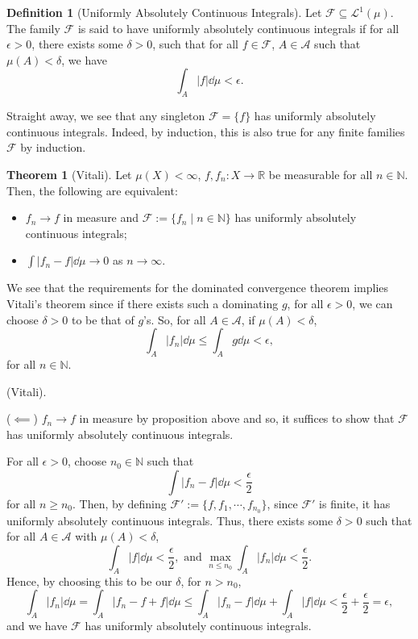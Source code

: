 \documentclass[
]{article}
\theoremstyle{definition}
\newtheorem{theorem}{Theorem}
\theoremstyle{definition}
\newtheorem{definition}{Definition}[section]
\begin{document}
\begin{definition}[Uniformly Absolutely Continuous Integrals]
  Let \(\mathcal{F} \subseteq \mathcal{L}^1(\mu)\). The family \(\mathcal{F}\) is 
  said to have uniformly absolutely continuous integrals if for all \(\epsilon > 0\), 
  there exists some \(\delta > 0\), such that for all \(f \in \mathcal{F}\), 
  \(A \in \mathcal{A}\) such that \(\mu(A) < \delta\), we have 
  \[\int_A |f| \dd \mu < \epsilon.\]
\end{definition}

Straight away, we see that any singleton \(\mathcal{F} = \{f\}\) has
uniformly absolutely continuous integrals. Indeed, by induction, this is
also true for any finite families \(\mathcal{F}\) by induction.

\begin{theorem}[Vitali]
  Let \(\mu(X) < \infty\), \(f, f_n : X \to \mathbb{R}\) be measurable for all 
  \(n \in \mathbb{N}\). Then, the following are equivalent:
  \begin{itemize}
    \item \(f_n \to f\) in measure and \(\mathcal{F} := \{f_n \mid n \in \mathbb{N}\}\) 
      has uniformly absolutely continuous integrals;
    \item \(\int |f_n - f| \dd \mu \to 0\) as \(n \to \infty\).
  \end{itemize}
\end{theorem}

We see that the requirements for the dominated convergence theorem
implies Vitali's theorem since if there exists such a dominating \(g\),
for all \(\epsilon > 0\), we can choose \(\delta > 0\) to be that of
\(g\)'s. So, for all \(A \in \mathcal{A}\), if \(\mu(A) < \delta\),
\[\int_A |f_n| \dd \mu \le \int_A g \dd \mu < \epsilon,\] for all
\(n \in \mathbb{N}\).

\proof (Vitali).

(\(\impliedby\)) \(f_n \to f\) in measure by proposition above and so,
it suffices to show that \(\mathcal{F}\) has uniformly absolutely
continuous integrals.

For all \(\epsilon > 0\), choose \(n_0 \in \mathbb{N}\) such that
\[\int |f_n - f| \dd\mu < \frac{\epsilon}{2}\] for all \(n \ge n_0\).
Then, by defining \(\mathcal{F}' := \{f, f_1, \cdots, f_{n_0}\}\), since
\(\mathcal{F}'\) is finite, it has uniformly absolutely continuous
integrals. Thus, there exists some \(\delta > 0\) such that for all
\(A \in \mathcal{A}\) with \(\mu(A) < \delta\),
\[\int_A |f| \dd \mu < \frac{\epsilon}{2}, \text{ and } 
    \max_{n \le n_0} \int_A |f_n| \dd\mu < \frac{\epsilon}{2}.\] Hence,
by choosing this to be our \(\delta\), for \(n > n_0\),
\[\int_A |f_n| \dd \mu = \int_A |f_n - f + f| \dd \mu 
    \le \int_A |f_n - f| \dd \mu + \int_A |f| \dd \mu < \frac{\epsilon}{2} 
    + \frac{\epsilon}{2} = \epsilon,\] and we have \(\mathcal{F}\) has
uniformly absolutely continuous integrals.
\end{document}
